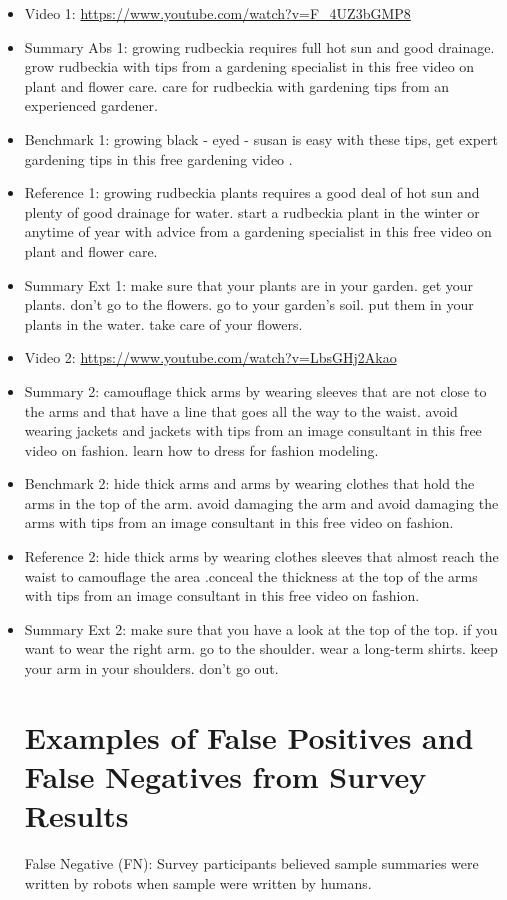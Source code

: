 \documentclass[sigconf]{acmart}
\begin{document}
\begin{itemize}

\item Video 1: \url{https://www.youtube.com/watch?v=F_4UZ3bGMP8}
\item Summary Abs 1: growing rudbeckia requires full hot sun and good drainage. grow rudbeckia with tips from a gardening specialist in this free video on plant and flower care. care for rudbeckia with gardening tips from an experienced gardener.
\item Benchmark 1: growing black - eyed - susan is easy with these tips, get expert gardening tips in this free gardening video .
\item Reference 1: growing rudbeckia plants requires a good deal of hot sun and plenty of good drainage for water. start a rudbeckia plant in the winter or anytime of year with advice from a gardening specialist in this free video on plant and flower care. 
\item Summary Ext 1: make sure that your plants are in your garden. get your plants. don't go to the flowers. go to your garden's soil. put them in your plants in the water. take care of your flowers. 
\item Video 2: \url{https://www.youtube.com/watch?v=LbsGHj2Akao}
\item Summary 2: camouflage thick arms by wearing sleeves that are not close to the arms and that have a line that goes all the way to the waist. avoid wearing jackets and jackets with tips from an image consultant in this free video on fashion. learn how to dress for fashion modeling.
\item Benchmark 2: hide thick arms and arms by wearing clothes that hold the arms in the top of the arm. avoid damaging the arm and avoid damaging the arms with tips from an image consultant in this free video on fashion.
\item Reference 2: hide thick arms by wearing clothes sleeves that almost reach the waist to camouflage the area .conceal the thickness at the top of the arms with tips from an image consultant in this free video on fashion.
\item Summary Ext 2: make sure that you have a look at the top of the top. if you want to wear the right arm. go to the shoulder. wear a long-term shirts. keep your arm in your shoulders. don't go out.

\section{Examples of False Positives and False Negatives from Survey Results}
\label{AppendixD}
False Negative (FN): Survey participants believed sample summaries were written by robots when sample were written by humans.  


\end{itemize}
\end{document}
